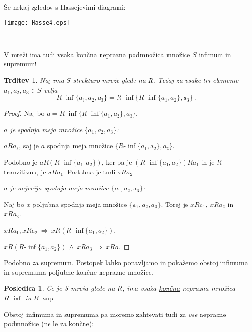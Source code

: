 \documentclass[11pt,paper=b5,footinclude,headinclude]{scrbook} %
\def\inn {{~\wedge~}}
\def\sledi {{~\Rightarrow~}}
\newtheorem*{trditev}{Trditev}
\newtheorem*{posledica}{Posledica}
\begin{document}
\bigskip
\newpage
Še nekaj zgledov s Hassejevimi diagrami:
\begin{center}
\texttt{[image: Hasse4.eps]}
\end{center}

------------------------------------------------

\bigskip

V mreži ima tudi vsaka \underline{končna} neprazna podmnožica množice $S$ infimum in supremum!

\begin{trditev}
Naj ima $S$ strukturo mreže glede na $R$. Tedaj za vsake tri elemente $a_1,a_2,a_3\in S$ velja
$$R\textrm{-}\inf\{a_1,a_2,a_3\} = R\textrm{-}\inf\{R\textrm{-}\inf\{a_1,a_2\}, a_3\}\,.$$
\end{trditev}

\begin{proof}
Naj bo $a = R\textrm{-}\inf\{R\textrm{-}\inf\{a_1,a_2\}, a_3\}$.

\emph{ $a$ je spodnja meja množice $\{a_1,a_2,a_3\}$:}

  $aRa_3$, saj je $a$ spodnja meja množice $\{R\textrm{-}\inf\{a_1,a_2\}, a_3\}$.

  Podobno je
  $aR(R\textrm{-}\inf\{a_1,a_2\})$, ker pa je $(R\textrm{-}\inf\{a_1,a_2\})Ra_1$ in je $R$ tranzitivna, je $aRa_1$. Podobno je tudi $aRa_2$.


\emph{ $a$ je največja spodnja meja množice $\{a_1,a_2,a_3\}$:}

Naj bo $x$ poljubna spodnja meja množice $\{a_1,a_2,a_3\}$. Torej je $xRa_1$, $xRa_2$ in $xRa_3$.

$xRa_1, xRa_2\sledi xR(R\textrm{-}\inf\{a_1,a_2\})$.

$xR(R\textrm{-}\inf\{a_1,a_2\}) \inn xRa_3\sledi xRa$.
\end{proof}

Podobno za supremum. Postopek lahko ponavljamo in
pokažemo obstoj infimuma in supremuma poljubne končne neprazne množice.

\medskip
%

\begin{posledica}
Če je $S$ mreža glede na $R$, ima vsaka \underline{končna} neprazna množica $R\textrm{-}\inf$
in $R\textrm{-}\sup$.
\end{posledica}

Obstoj infimuma in supremuma pa moremo zahtevati tudi za \emph{ vse} neprazne podmnožice (ne le za končne):
\end{document}
